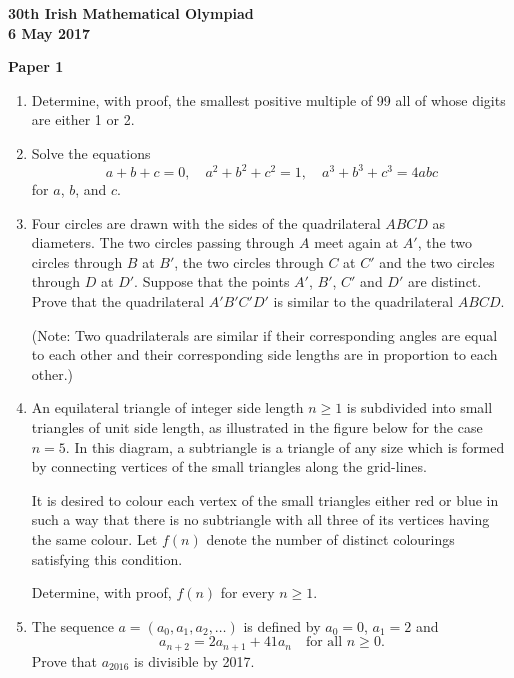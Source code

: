 \documentclass[12pt]{article}
\begin{document}
\begin{center}
{\large\bfseries 30th Irish Mathematical Olympiad\\6 May 2017}
\end{center}
\bigskip\noindent\textbf{Paper 1}\bigskip
\begin{enumerate}
\item Determine, with proof, the smallest positive multiple of 99 all of whose digits are either 1 or 2.

\item Solve the equations
\[
a + b + c = 0, \quad a^2 + b^2 + c^2 = 1, \quad a^3 + b^3 + c^3 = 4abc
\]
for $a$, $b$, and $c$.

\item Four circles are drawn with the sides of the quadrilateral $ABCD$ as diameters. The two circles passing through $A$ meet again at $A'$, the two circles through $B$ at $B'$, the two circles through $C$ at $C'$ and the two circles through $D$ at $D'$. Suppose that the points $A'$, $B'$, $C'$ and $D'$ are distinct. Prove that the quadrilateral $A'B'C'D'$ is similar to the quadrilateral $ABCD$.

(Note: Two quadrilaterals are similar if their corresponding angles are equal to each other and their corresponding side lengths are in proportion to each other.)

\item An equilateral triangle of integer side length $n \geq 1$ is subdivided into small triangles of unit side length, as illustrated in the figure below for the case $n = 5$. In this diagram, a subtriangle is a triangle of any size which is formed by connecting vertices of the small triangles along the grid-lines.

It is desired to colour each vertex of the small triangles either red or blue in such a way that there is no subtriangle with all three of its vertices having the same colour. Let $f(n)$ denote the number of distinct colourings satisfying this condition.

Determine, with proof, $f(n)$ for every $n \geq 1$.

\item The sequence $a = (a_0, a_1, a_2, \ldots)$ is defined by $a_0 = 0$, $a_1 = 2$ and
\[
a_{n+2} = 2a_{n+1} + 41a_n \quad \text{for all } n \geq 0.
\]
Prove that $a_{2016}$ is divisible by 2017.
\end{enumerate}
\end{document}
